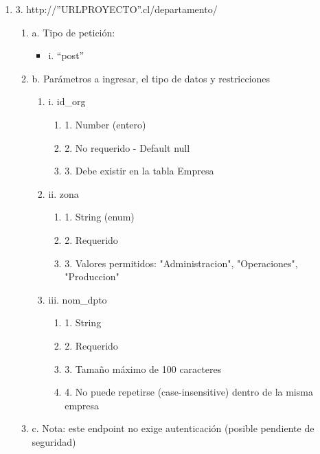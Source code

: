 \begin{enumerate}
    \item 3. http://”URLPROYECTO”.cl/departamento/
    \begin{enumerate}
        \item a. Tipo de petición:
            \begin{itemize}
               \item i. “post”
            \end{itemize}
        \item b. Parámetros a ingresar, el tipo de datos y restricciones
            \begin{enumerate}
                \item i. id\_org
                    \begin{enumerate}
                        \item 1. Number (entero)
                        \item 2. No requerido - Default null
                        \item 3. Debe existir en la tabla Empresa
                    \end{enumerate}
                \item ii. zona
                    \begin{enumerate}
                        \item 1. String (enum)
                        \item 2. Requerido
                        \item 3. Valores permitidos: "Administracion", "Operaciones", "Produccion"
                    \end{enumerate}
                \item iii. nom\_dpto
                    \begin{enumerate}
                        \item 1. String
                        \item 2. Requerido
                        \item 3. Tamaño máximo de 100 caracteres
                        \item 4. No puede repetirse (case-insensitive) dentro de la misma empresa
                    \end{enumerate}
            \end{enumerate}
        \item c. Nota: este endpoint no exige autenticación (posible pendiente de seguridad)
    \end{enumerate}


\end{enumerate}
